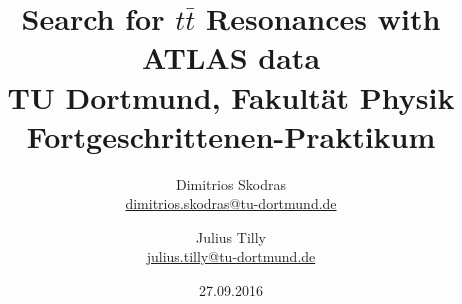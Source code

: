 

\usepackage{subcaption}
\usepackage{placeins}
\newcommand{\minwidth}{0.40}


\title{Search for $t\bar t$ Resonances with ATLAS data \\ \vspace{.5cm}%
	\large TU Dortmund, Fakultät Physik\\ 
	\normalsize Fortgeschrittenen-Praktikum}

\author{Dimitrios Skodras\\			%
	{\small \href{dimitrios.skodras@tu-dortmund.de}{dimitrios.skodras@tu-dortmund.de}}	%
				\and			%
	Julius Tilly\\					%
	{\small \href{julius.tilly@tu-dortmund.de}{julius.tilly@tu-dortmund.de}}		%
}
\date{27.09.2016}				%



	

\maketitle					%
\thispagestyle{empty} 				%



\tableofcontents


\newpage					%


